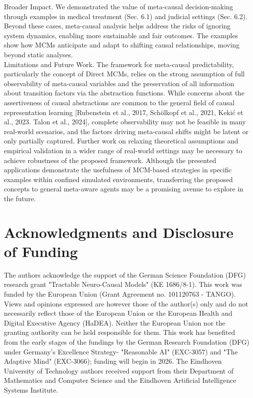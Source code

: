 \documentclass[10pt]{article}
\begin{document}
Broader Impact. We demonstrated the value of meta-causal decision-making through examples in medical treatment (Sec. 6.1) and judicial settings (Sec. 6.2). Beyond these cases, meta-causal analysis helps address the risks of ignoring system dynamics, enabling more sustainable and fair outcomes. The examples show how MCMs anticipate and adapt to shifting causal relationships, moving beyond static analyses.\\[0pt]
Limitations and Future Work. The framework for meta-causal predictability, particularly the concept of Direct MCMs, relies on the strong assumption of full observability of meta-causal variables and the preservation of all information about transition factors via the abstraction functions. While concerns about the assertiveness of causal abstractions are common to the general field of causal representation learning [Rubenstein et al., 2017, Schölkopf et al., 2021, Kekić et al., 2023. Talon et al., 2024], complete observability may not be feasible in many real-world scenarios, and the factors driving meta-causal shifts might be latent or only partially captured. Further work on relaxing theoretical assumptions and empirical validation in a wider range of real-world settings may be necessary to achieve robustness of the proposed framework. Although the presented applications demonstrate the usefulness of MCM-based strategies in specific examples within confined simulated environments, transferring the proposed concepts to general meta-aware agents may be a promising avenue to explore in the future.

\section*{Acknowledgments and Disclosure of Funding}
The authors acknowledge the support of the German Science Foundation (DFG) research grant "Tractable Neuro-Causal Models" (KE 1686/8-1). This work was funded by the European Union (Grant Agreement no. 101120763 - TANGO). Views and opinions expressed are however those of the author(s) only and do not necessarily reflect those of the European Union or the European Health and Digital Executive Agency (HaDEA). Neither the European Union nor the granting authority can be held responsible for them. This work has benefited from the early stages of the fundings by the German Research Foundation (DFG) under Germany's Excellence Strategy- "Reasonable AI" (EXC-3057) and "The Adaptive Mind" (EXC-3066); funding will begin in 2026. The Eindhoven University of Technology authors received support from their Department of Mathematics and Computer Science and the Eindhoven Artificial Intelligence Systems Institute.
\end{document}

